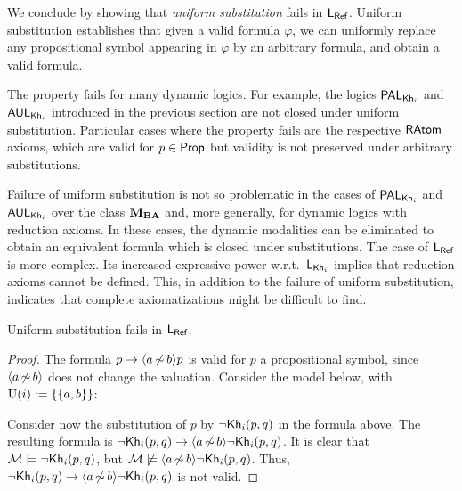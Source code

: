 We conclude by showing that \emph{uniform substitution} fails in $\mathsf{L_{Ref}}$. Uniform substitution establishes that given a valid formula $\varphi$, we can uniformly replace any propositional symbol appearing in $\varphi$ by an arbitrary formula, and obtain a valid formula.  
\begin{mrevised}
The property fails for many dynamic logics.  For example, the logics $\mathsf{PAL}_{{\sf Kh}_i}$ and $\mathsf{AUL}_{{\sf Kh}_i}$ introduced in the previous section are not closed under uniform substitution.  Particular cases where the property fails are the respective $\textsf{RAtom}$ axioms, which are valid for $p \in {\rm \sf Prop}$ but validity is not preserved under arbitrary substitutions. 

Failure of uniform substitution is not so problematic in the cases of $\mathsf{PAL}_{{\sf Kh}_i}$ and $\mathsf{AUL}_{{\sf Kh}_i}$ over the class $\mathbf{M}_{\mathbf{BA}}$ and, more generally, for dynamic logics with 
reduction axioms. In these cases, the dynamic modalities can be eliminated to obtain an equivalent formula which is closed under substitutions. The case of $\mathsf{L_{Ref}}$ is more complex. Its increased expressive power w.r.t.\ $\mathsf{L}_{{\sf Kh}_i}$ implies that reduction axioms cannot be defined.  This, in addition to the failure of uniform substitution, indicates that complete axiomatizations might be difficult to find. 
\end{mrevised}

\medskip

\begin{proposition}\label{prop:substitution-ref}
    Uniform substitution fails in $\mathsf{L_{Ref}}$.
\end{proposition}

\begin{proof}
The formula $p\to\langle a{\,\not\sim\,}b \rangle p$ is valid for $p$ a propositional symbol, since $\langle a{\,\not\sim\,}b \rangle$ does not change the valuation. Consider the model below, with $\operatorname{U}(i):=\{ \{ a,b \} \}$:
\begin{center}
\end{center}
Consider now the substitution of $p$ by $\neg{\sf Kh}_i(p,q)$ in the formula above. The resulting formula is $\neg{\sf Kh}_i(p,q)\to\langle a{\,\not\sim\,}b \rangle\neg{\sf Kh}_i(p,q)$. It is clear that $\mathcal{M}\models\neg{\sf Kh}_i(p,q)$, but $\mathcal{M}\not\models\langle a{\,\not\sim\,}b \rangle\neg{\sf Kh}_i(p,q)$. Thus, $\neg{\sf Kh}_i(p,q)\to\langle a{\,\not\sim\,}b \rangle\neg{\sf Kh}_i(p,q)$ is not valid.
\end{proof}

